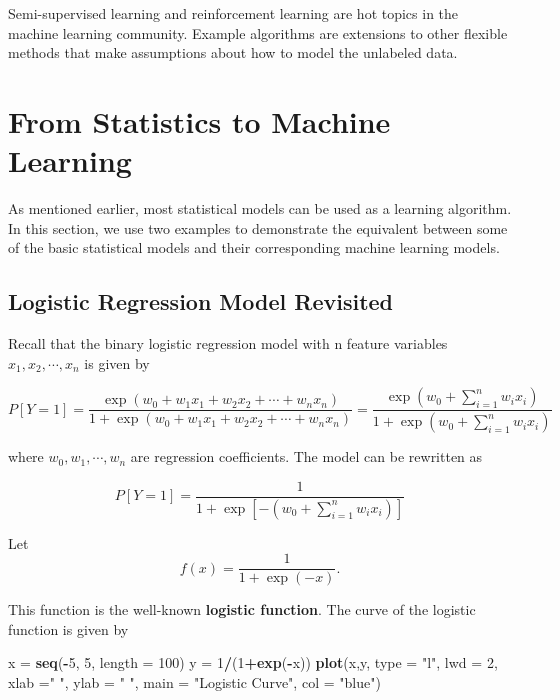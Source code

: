 \documentclass[
]{book}
\newenvironment{Shaded}{\begin{snugshade}}{\end{snugshade}}
\newcommand{\AttributeTok}[1]{\textcolor[rgb]{0.13,0.29,0.53}{#1}}
\newcommand{\DecValTok}[1]{\textcolor[rgb]{0.00,0.00,0.81}{#1}}
\newcommand{\FunctionTok}[1]{\textcolor[rgb]{0.13,0.29,0.53}{\textbf{#1}}}
\newcommand{\NormalTok}[1]{#1}
\newcommand{\OtherTok}[1]{\textcolor[rgb]{0.56,0.35,0.01}{#1}}
\newcommand{\SpecialCharTok}[1]{\textcolor[rgb]{0.81,0.36,0.00}{\textbf{#1}}}
\newcommand{\StringTok}[1]{\textcolor[rgb]{0.31,0.60,0.02}{#1}}
\begin{document}
Semi-supervised learning and reinforcement learning are hot topics in the machine learning community. Example algorithms are extensions to other flexible methods that make assumptions about how to model the unlabeled data.

\hfill\break

\hypertarget{from-statistics-to-machine-learning}{%
\section{From Statistics to Machine Learning}\label{from-statistics-to-machine-learning}}

As mentioned earlier, most statistical models can be used as a learning algorithm. In this section, we use two examples to demonstrate the equivalent between some of the basic statistical models and their corresponding machine learning models.

\hypertarget{logistic-regression-model-revisited}{%
\subsection{Logistic Regression Model Revisited}\label{logistic-regression-model-revisited}}

Recall that the binary logistic regression model with n feature variables \(x_1, x_2, \cdots, x_n\) is given by

\[
P[Y = 1] = \frac{\exp(w_0 + w_1x_1 + w_2x_2 + \cdots + w_nx_n)}{1+\exp(w_0 + w_1x_1 + w_2x_2 + \cdots + w_nx_n)} = \frac{\exp(w_0+\sum_{i=1}^n w_ix_i)}{1 + \exp(w_0+\sum_{i=1}^n w_ix_i)}
\]

where \(w_0, w_1, \cdots, w_n\) are regression coefficients. The model can be rewritten as

\[
P[Y=1] = \frac{1}{1+ \exp[-(w_0+\sum_{i=1}^n w_ix_i)]}
\]

Let
\[
f(x) = \frac{1}{1+\exp(-x)}.
\]

This function is the well-known \textbf{logistic function}. The curve of the logistic function is given by

\begin{Shaded}
\begin{Highlighting}[]
\NormalTok{x }\OtherTok{=} \FunctionTok{seq}\NormalTok{(}\SpecialCharTok{{-}}\DecValTok{5}\NormalTok{, }\DecValTok{5}\NormalTok{, }\AttributeTok{length =} \DecValTok{100}\NormalTok{)}
\NormalTok{y }\OtherTok{=} \DecValTok{1}\SpecialCharTok{/}\NormalTok{(}\DecValTok{1}\SpecialCharTok{+}\FunctionTok{exp}\NormalTok{(}\SpecialCharTok{{-}}\NormalTok{x))}
\FunctionTok{plot}\NormalTok{(x,y, }\AttributeTok{type =} \StringTok{"l"}\NormalTok{, }\AttributeTok{lwd =} \DecValTok{2}\NormalTok{, }\AttributeTok{xlab =}\StringTok{" "}\NormalTok{, }\AttributeTok{ylab =} \StringTok{" "}\NormalTok{, }
     \AttributeTok{main =} \StringTok{"Logistic Curve"}\NormalTok{, }\AttributeTok{col =} \StringTok{"blue"}\NormalTok{)}
\end{Highlighting}
\end{Shaded}
\end{document}
